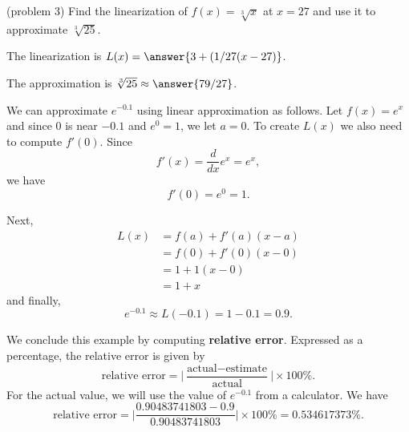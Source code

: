 \documentclass{ximera}
\begin{document}
\begin{problem}(problem 3)
Find the linearization of $f(x) = \sqrt[3] x$ at $x = 27$ and use it to approximate $\sqrt[3]{25}$.

The linearization is  $L(x) = \answer{3 + (1/27 (x-27)}$.

The approximation is $\sqrt[3]{25} \approx \answer{79/27}$.
\end{problem}

\begin{example}[example 4]
We can approximate $e^{-0.1}$ using linear approximation as follows. 
Let $f(x) = e^x$ and since 0 is near $-0.1$ and $e^0 = 1$, we let 
$a = 0$. To create $L(x)$ we also need to compute $f'(0)$. 
Since 
\[f'(x) = \frac{d}{dx} e^x = e^x,\] 
we have
\[f'(0) = e^0 = 1.\]

Next, 
\begin{align*}
L(x) &= f(a) + f'(a)(x - a) \\
&= f(0) + f'(0)(x - 0) \\
&= 1 + 1(x - 0)\\
& = 1 + x
\end{align*}
and finally,
\[
e^{-0.1} \approx L(-0.1) = 1 - 0.1 = 0.9.
\]

We conclude this example by computing \textbf{relative error}. Expressed as a percentage, the relative error is given by
\[
\text{relative error} = \Big|\frac{\text{actual} - \text{estimate}}{\text{actual}}\Big| \times 100\%.
\]
For the actual value, we will use the value of $e^{-0.1}$ from a calculator.
We have
\[
\text{relative error} = \Big|\frac{0.90483741803 - 0.9}{0.90483741803}\Big| \times 100\% = 0.534617373\%.
\]

\end{example}


\begin{image}
\end{image}
\end{document}
